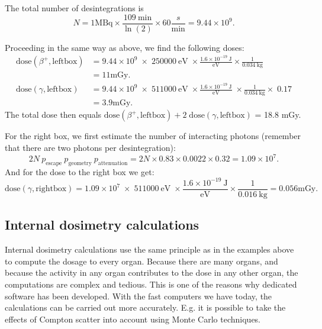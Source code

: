 \documentclass[11pt,oneside]{article}
\begin{document}
The total number of desintegrations is 
\begin{equation}
  N = 1 \mbox{MBq} \times \frac{109\ \mbox{min}}{\ln(2)} \times 60
    \frac{s}{\mbox{min}} = 9.44 \times 10^9.
\end{equation}

Proceeding in the same way as above, we find the following doses:
\begin{align}
\mbox{dose}(\beta^+,\mbox{leftbox}) &= 9.44 \times 10^9 \; \times \; 250000
    \ \mbox{eV} \; \times \frac{1.6 \times 10^{-19} \ \mbox{J}}{\mbox{eV}}
        \times \frac{1}{0.034 \ \mbox{kg}}  \nonumber\\
     &= 11 \mbox{mGy}.  \\
\mbox{dose}(\gamma, \mbox{leftbox}) &= 9.44 \times 10^9 \; \times
    \; 511000 \ \mbox{eV} \;
    \times \frac{1.6 \times 10^{-19} \ \mbox{J}}{\mbox{eV}} \;
     \times \frac{1}{0.034\ \mbox{kg}} \times \; 0.17 \nonumber\\
     &= 3.9 \mbox{mGy}.
\end{align}
The total dose then equals $\mbox{dose}(\beta^+,\mbox{leftbox}) + 2 \;
\mbox{dose}(\gamma, \mbox{leftbox})$ = 18.8 mGy.

For the right box, we first estimate the number of interacting photons
(remember that there are two photons per desintegration):
\begin{equation}
  2N \ p_{\mbox{escape}}\ p_{\mbox{geometry}}\ p_{\mbox{attenuation}}
   = 2N \times 0.83 \times 0.0022 \times 0.32 = 1.09 \times 10^7.
\end{equation}
And for the dose to the right box we get:
\begin{equation}
\mbox{dose}(\gamma, \mbox{rightbox}) = 1.09 \times 10^7\; \times \; 511000 \ \mbox{eV} \;
  \times \frac{1.6 \times 10^{-19} \ \mbox{J}}{\mbox{eV}}  \times \frac{1}{0.016\ \mbox{kg}}
   = 0.056 \mbox{mGy}.
\end{equation}


\subsection{Internal dosimetry calculations}
Internal dosimetry calculations use the same principle as in the
examples above to compute the dosage to every organ. Because there are
many organs, and because the activity in any organ contributes to the
dose in any other organ, the computations are complex and tedious.
This is one of the reasons why dedicated software has been developed.
With the fast computers we have today, the calculations can be carried
out more accurately. E.g.  it is possible to take the effects of
Compton scatter into account using Monte Carlo techniques.
\end{document}
